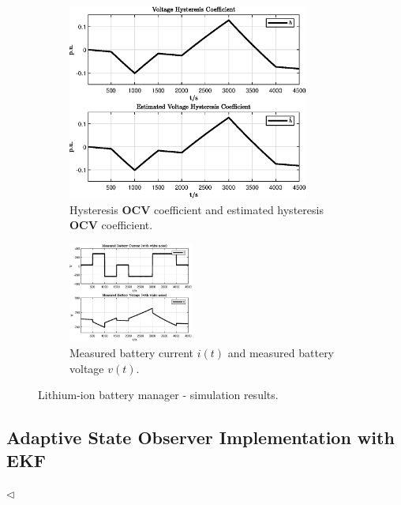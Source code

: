 \documentclass[11pt,a4paper,oneside]{book}
\numberwithin{equation}{section}
\theoremstyle{it}
\theoremstyle{definition}
\begin{document}
\begin{figure}[H]
	\centering
	\begin{subfigure}{.5\textwidth}
		\centering
		\includegraphics[width = 225pt, angle=0, 
		keepaspectratio]{figures/lithium_ion_battery/state_state_hat_3.eps}
		\captionsetup{width=0.65\textwidth, font=footnotesize}
		\caption{Hysteresis $\mathbf{OCV}$ coefficient and estimated hysteresis 
			$\mathbf{OCV}$ coefficient.}
		\label{}
	\end{subfigure}%
	\begin{subfigure}{.5\textwidth}
		\centering
		\includegraphics[width = 0.45\textwidth, width = 225pt, angle=0, 
		keepaspectratio]{figures/lithium_ion_battery/outputs.eps}
		\captionsetup{width=0.65\textwidth, font=footnotesize}
		\caption{Measured battery current $i(t)$ and measured battery voltage 
			$v(t)$.}
		\label{}
	\end{subfigure}
	\captionsetup{width=0.5\textwidth, font=small}
	\caption{Lithium-ion battery manager - simulation results.}
	\label{}
\end{figure}

\subsection{Adaptive State Observer Implementation with EKF}
$\triangleleft$ 
\end{document}
